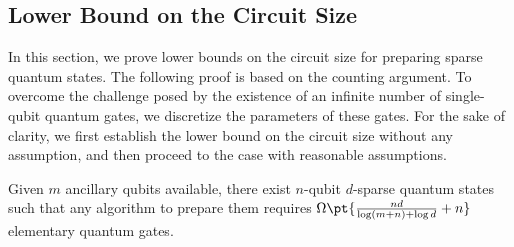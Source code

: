\documentclass[a4paper,UKenglish,cleveref, autoref, thm-restate]{lipics-v2021}
\newcommand{\om}{\Omega\pt}
\begin{document}
\subsection{Lower Bound on the Circuit Size }

In this section, we prove  lower bounds on the circuit size  for preparing sparse quantum states. The following proof is based on the counting argument. To overcome the challenge posed by the existence of an infinite number of single-qubit quantum gates, we discretize the parameters of these gates. For the sake of clarity, we first establish the lower bound on the circuit size without any assumption, and then proceed to the case with reasonable assumptions.

\begin{theorem}\label{res:thm:lb1}
Given $m$ ancillary qubits available, there exist $n$-qubit $d$-sparse quantum states  such that any algorithm to prepare them requires $\om{\frac{nd}{\log(m + n) + \log d} + n}$ elementary quantum gates.
\end{theorem}
\end{document}
